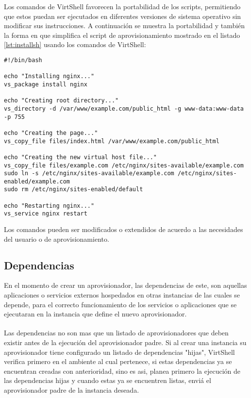 Los comandos de VirtShell favorecen la portabilidad de los scripts, permitiendo que estos puedan ser ejecutados en diferentes versiones de sistema operativo sin modificar sus instrucciones. A continuación se muestra la portabilidad y también la forma en que simplifica el script de aprovisionamiento mostrado en el listado \ref{lst:installsh} usando los comandos de VirtShell:

\begin{lstlisting}[style=json, caption=Ejemplo de un script shell usando los comandos de VirtShell]
#!/bin/bash

echo "Installing nginx..."
vs_package install nginx

echo "Creating root directory..."
vs_directory -d /var/www/example.com/public_html -g www-data:www-data -p 755

echo "Creating the page..."
vs_copy_file files/index.html /var/www/example.com/public_html

echo "Creating the new virtual host file..."
vs_copy_file files/example.com /etc/nginx/sites-available/example.com
sudo ln -s /etc/nginx/sites-available/example.com /etc/nginx/sites-enabled/example.com
sudo rm /etc/nginx/sites-enabled/default

echo "Restarting nginx..."
vs_service nginx restart
\end{lstlisting}

\vspace{5mm}

Los comandos pueden ser modificados o extendidos de acuerdo a las necesidades del usuario o de aprovisionamiento.

\subsection{Dependencias}
En el momento de crear un aprovisionador, las dependencias de este, son aquellas aplicaciones o servicios externos hospedados en otras instancias de las cuales se depende, para el correcto funcionamiento de los servicios o aplicaciones que se ejecutaran en la instancia que define el nuevo aprovisionador.\\
\\
Las dependencias no son mas que un listado de aprovisionadores que deben existir antes de la ejecución del aprovisionador padre. Si al crear una instancia su aprovisionador tiene configurado un listado de dependencias "hijas", VirtShell verifica primero en el ambiente al cual pertenece, si estas dependencias ya se encuentran creadas con anterioridad, sino es asi, planea primero la ejecución de las dependencias hijas y cuando estas ya se encuentren listas, enviá el aprovisionador padre de la instancia deseada.

